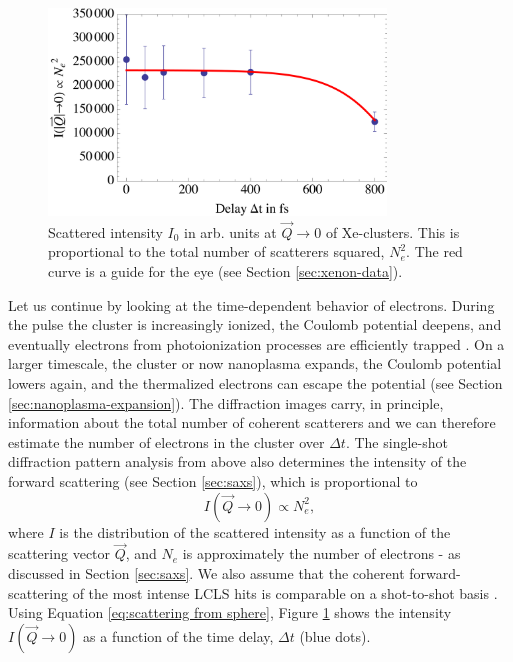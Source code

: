 \begin{figure}
	\centering
		\includegraphics[width=0.80\textwidth]{images/results/number-of-scatterers.png}
	\caption[Time-resolved behavior of number of scatterers due to nanoplasma expansion]{Scattered intensity $I_{0}$ in arb. units at $\vec{Q}\rightarrow 0$ of Xe-clusters. This is proportional to the total number of scatterers squared, $N_{e}^{2}$. The red curve is a guide for the eye (see Section \ref{sec:xenon-data}).}
	\label{fig:number-of-scatterer}
\end{figure}
%
Let us continue by looking at the time-dependent behavior of electrons. During the pulse the cluster is increasingly ionized, the Coulomb potential deepens, and eventually electrons from photoionization processes are efficiently trapped \cite{Arbeiter-2011-NJP}. On a larger timescale, the cluster or now nanoplasma expands, the Coulomb potential lowers again, and the thermalized electrons can escape the potential (see Section \ref{sec:nanoplasma-expansion}). The diffraction images carry, in principle, information about the total number of coherent scatterers and we can therefore estimate the number of electrons in the cluster over $\Delta t$. The single-shot diffraction pattern analysis from above also determines the intensity of the forward scattering (see Section \ref{sec:saxs}), which is proportional to
\begin{equation}{}
I\left(\vec{Q}\rightarrow 0\right) \propto N_{e}^{2},
\label{eq:intensity-prop-to-electrons}
\end{equation}
where $I$ is the distribution of the scattered intensity as a function of the scattering vector $\vec{Q}$, and $N_{e}$ is approximately the number of electrons - as discussed in Section \ref{sec:saxs}. We also assume that the coherent forward-scattering of the most intense LCLS hits is comparable on a shot-to-shot basis \cite{Gorkhover-2012-PRL}. Using Equation \eqref{eq:scattering from sphere}, Figure \ref{fig:number-of-scatterer} shows the intensity $I\left(\vec{Q}\rightarrow 0\right)$ as a function of the time delay, $\Delta t$ (blue dots).
